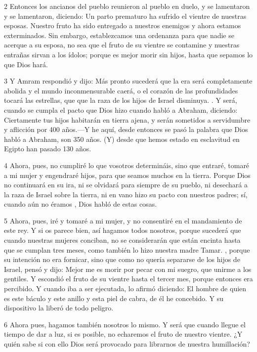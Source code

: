 \par 2 Entonces los ancianos del pueblo reunieron al pueblo en duelo, y se lamentaron y se lamentaron, diciendo: Un parto prematuro ha sufrido el vientre de nuestras esposas. Nuestro fruto ha sido entregado a nuestros enemigos y ahora estamos exterminados. Sin embargo, establezcamos una ordenanza para que nadie se acerque a su esposa, no sea que el fruto de su vientre se contamine y nuestras entrañas sirvan a los ídolos; porque es mejor morir sin hijos, hasta que sepamos lo que Dios hará.

\par 3 Y Amram respondió y dijo: Más pronto sucederá que la era será completamente abolida y el mundo inconmensurable caerá, o el corazón de las profundidades tocará las estrellas, que que la raza de los hijos de Israel disminuya. . Y será, cuando se cumpla el pacto que Dios hizo cuando habló a Abraham, diciendo: Ciertamente tus hijos habitarán en tierra ajena, y serán sometidos a servidumbre y aflicción por 400 años.—Y he aquí, desde entonces se pasó la palabra que Dios habló a Abraham, son 350 años. (Y) desde que hemos estado en esclavitud en Egipto han pasado 130 años.

\par 4 Ahora, pues, no cumpliré lo que vosotros determináis, sino que entraré, tomaré a mi mujer y engendraré hijos, para que seamos muchos en la tierra. Porque Dios no continuará en su ira, ni se olvidará para siempre de su pueblo, ni desechará a la raza de Israel sobre la tierra, ni en vano hizo su pacto con nuestros padres; sí, cuando aún no éramos , Dios habló de estas cosas.

\par 5 Ahora, pues, iré y tomaré a mi mujer, y no consentiré en el mandamiento de este rey. Y si os parece bien, así hagamos todos nosotros, porque sucederá que cuando nuestras mujeres conciban, no se considerarán que están encinta hasta que se cumplan tres meses, como también lo hizo nuestra madre Tamar. , porque su intención no era fornicar, sino que como no quería separarse de los hijos de Israel, pensó y dijo: Mejor me es morir por pecar con mi suegro, que unirme a los gentiles. Y escondió el fruto de su vientre hasta el tercer mes, porque entonces era percibido. Y cuando iba a ser ejecutada, lo afirmó diciendo: El hombre de quien es este báculo y este anillo y esta piel de cabra, de él he concebido. Y su dispositivo la liberó de todo peligro.

\par 6 Ahora pues, hagamos también nosotros lo mismo. Y será que cuando llegue el tiempo de dar a luz, si es posible, no echaremos el fruto de nuestro vientre. ¿Y quién sabe si con ello Dios será provocado para librarnos de nuestra humillación?

